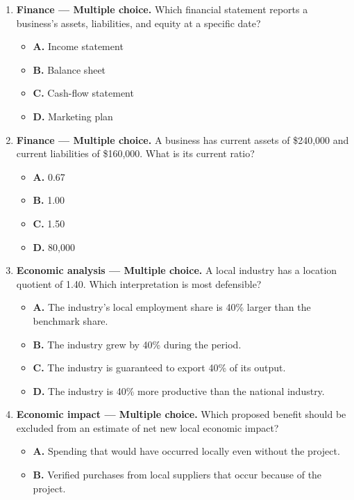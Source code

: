 \documentclass[11pt,letterpaper,oneside,openany]{book}
\begin{document}
\begin{enumerate}[leftmargin=*,itemsep=1.1em]
\item \textbf{Finance --- Multiple choice.} Which financial statement reports a business's assets, liabilities, and equity at a specific date?
\begin{itemize}[leftmargin=1.7em]
\item \textbf{A.} Income statement
\item \textbf{B.} Balance sheet
\item \textbf{C.} Cash-flow statement
\item \textbf{D.} Marketing plan
\end{itemize}
\item \textbf{Finance --- Multiple choice.} A business has current assets of \$240,000 and current liabilities of \$160,000. What is its current ratio?
\begin{itemize}[leftmargin=1.7em]
\item \textbf{A.} 0.67
\item \textbf{B.} 1.00
\item \textbf{C.} 1.50
\item \textbf{D.} 80,000
\end{itemize}
\item \textbf{Economic analysis --- Multiple choice.} A local industry has a location quotient of 1.40. Which interpretation is most defensible?
\begin{itemize}[leftmargin=1.7em]
\item \textbf{A.} The industry's local employment share is 40\% larger than the benchmark share.
\item \textbf{B.} The industry grew by 40\% during the period.
\item \textbf{C.} The industry is guaranteed to export 40\% of its output.
\item \textbf{D.} The industry is 40\% more productive than the national industry.
\end{itemize}
\item \textbf{Economic impact --- Multiple choice.} Which proposed benefit should be excluded from an estimate of net new local economic impact?
\begin{itemize}[leftmargin=1.7em]
\item \textbf{A.} Spending that would have occurred locally even without the project.
\item \textbf{B.} Verified purchases from local suppliers that occur because of the project.

\end{itemize}
\end{enumerate}
\end{document}
